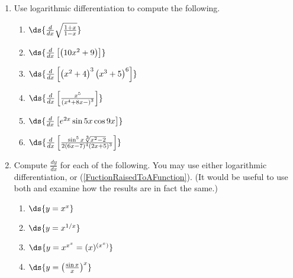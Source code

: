 \begin{multicols}{2}
\begin{enumerate}
\begin{enumerate}
  \end{enumerate}
\item Use logarithmic differentiation to compute the following.
  \begin{enumerate}
  \item $\ds{\frac{d}{dx}\sqrt{\frac{1+x}{1-x}}}$
  \item $\ds{\frac{d}{dx}\left[\left(10x^2+9\right)\right]}$
  \item $\ds{\frac{d}{dx}
             \left[\left(x^2+4\right)^3\left(x^3+5\right)^6\right]}$
  \item $\ds{\frac{d}{dx}\left[\frac{x^5}{\left(x^4+8x-\right)^3}\right]}$
  \item $\ds{\frac{d}{dx}\left[e^{2x}\sin5x\cos9x\right]}$
  \item $\ds{\frac{d}{dx}
        \left[\frac{\sin^5x\sqrt[3]{x^2-2}}{2(6x-7)^4(2x+5)^3}\right]}$
  \end{enumerate}
\item Compute $\frac{dy}{dx}$ for each of the following.  You may use
      either logarithmic differentiation, 
      or (\ref{FuctionRaisedToAFunction}).  (It would be useful
      to use both and examine how the results are in fact the same.)
  \begin{enumerate}
  \item $\ds{y=x^x}$
  \item $\ds{y=x^{1/x}}$
  \item $\ds{y=x^{x^x}=(x)^{\left(x^x\right)}}$
  \item $\ds{y=\left(\frac{\sin x}x\right)^x}$
  \end{enumerate}

\end{enumerate}
\end{multicols}






          
\newpage









\newpage



